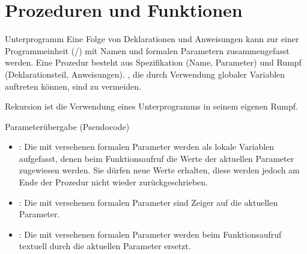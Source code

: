 \section{%
    Prozeduren und Funktionen%
}

\begin{Def}{Unterprogramm}
    Eine Folge von Deklarationen und Anweisungen kann zur einer Programmeinheit
    (/) mit Namen und formalen
    Parametern zusammengefasst werden.
    Eine Prozedur besteht aus Spezifikation (Name, Parameter) und Rumpf
    (Deklarationsteil, Anweisungen).
    , die durch Verwendung globaler Variablen auftreten
    können, sind zu vermeiden.
\end{Def}

\begin{Def}{Rekursion}
     ist die Verwendung eines Unterprogramms
    in seinem eigenen Rumpf.
\end{Def}

\begin{Def}{Parameterübergabe (Pseudocode)}
    \begin{itemize}
        \item {}: Die mit  versehenen
        formalen Parameter werden als lokale Variablen aufgefasst, denen beim
        Funktionsaufruf die Werte der aktuellen Parameter zugewiesen werden.
        Sie dürfen neue Werte erhalten, diese werden jedoch am Ende der
        Prozedur nicht wieder zurückgeschrieben.

        \item {}: Die mit  versehenen
        formalen Parameter sind Zeiger auf die aktuellen Parameter.

        \item {}: Die mit  versehenen
        formalen Parameter werden beim Funktionsaufruf textuell durch die
        aktuellen Parameter ersetzt.
    \end{itemize}
\end{Def}

